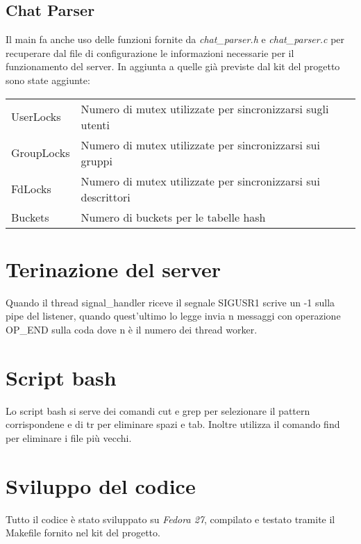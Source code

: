 \documentclass[11pt]{article}
\begin{document}
\subsection{Chat Parser}
Il main fa anche uso delle funzioni fornite da \emph{chat\_parser.h} e \emph{chat\_parser.c} per recuperare dal file di configurazione le informazioni necessarie per il funzionamento del server. In aggiunta a quelle già previste dal kit del progetto sono state aggiunte:

\begin{tabular}{ll}
	UserLocks & Numero di mutex utilizzate per sincronizzarsi sugli utenti\\
	GroupLocks & Numero di mutex utilizzate per sincronizzarsi sui gruppi\\
	FdLocks & Numero di mutex utilizzate per sincronizzarsi sui descrittori\\
	Buckets & Numero di buckets per le tabelle hash\\
\end{tabular}

\section{Terinazione del server}
Quando il thread signal\_handler riceve il segnale SIGUSR1 scrive un -1 sulla pipe del listener, quando quest'ultimo lo legge invia n messaggi con operazione OP\_END sulla coda dove n è il numero dei thread worker.


\section{Script bash}
Lo script bash si serve dei comandi cut e grep per selezionare il pattern corrispondene e di tr per eliminare spazi e tab. Inoltre utilizza il comando find per eliminare i file più vecchi.
\section{Sviluppo del codice}
Tutto il codice è stato sviluppato su \emph{Fedora 27}, compilato e testato tramite il Makefile fornito nel kit del progetto.
\end{document}
